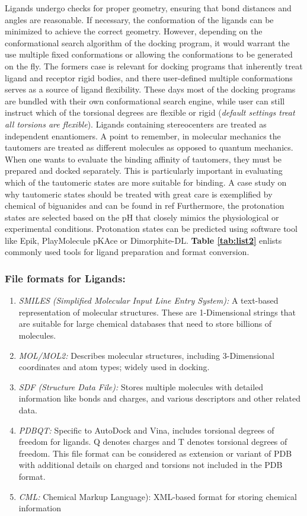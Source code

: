 Ligands undergo checks for proper geometry, ensuring that bond distances and angles are reasonable. If necessary, the conformation of the ligands can be minimized to achieve the correct geometry. However, depending on the conformational search algorithm of the docking program, it would warrant the use multiple fixed conformations or allowing the conformations to be generated on the fly. The formers case is relevant for docking programs that inherently treat ligand and receptor rigid bodies, and there user-defined multiple conformations serves as a source of ligand flexibility. These days most of the docking programs are bundled with their own conformational search engine, while user can still instruct which of the torsional degrees are flexible or rigid (\textit{default settings treat all torsions are flexible}).
Ligands containing stereocenters are treated as independent enantiomers. A point to remember, in molecular mechanics the tautomers are treated as different molecules as opposed to quantum mechanics. When one wants to evaluate the binding affinity of tautomers, they must be prepared and docked separately. This is particularly important in evaluating which of the tautomeric states are more suitable for binding. A case study on why tautomeric states should be treated with great care is exemplified by chemical of biguanides and can be found in ref\cite{bib42} Furthermore, the protonation states are selected based on the pH that closely mimics the physiological or experimental conditions. Protonation states can be predicted using software tool like Epik\cite{bib45, bib46}, PlayMolecule pKAce\cite{bib43} or Dimorphite-DL\cite{bib44}. \textbf{Table \ref{tab:list2}} enlists commonly used tools for ligand preparation and format conversion. 

\subsubsection*{File formats for Ligands:}
\begin{enumerate}
        \item \textit{SMILES (Simplified Molecular Input Line Entry System):} A text-based representation of molecular structures. These are 1-Dimensional strings that are suitable for large chemical databases that need to store billions of molecules. 
	   \item \textit{MOL/MOL2:} Describes molecular structures, including 3-Dimensional coordinates and atom types; widely used in docking.
	   \item \textit{SDF (Structure Data File):} Stores multiple molecules with detailed information like bonds and charges, and various descriptors and other related data. 
	   \item \textit{PDBQT:} Specific to AutoDock and Vina, includes torsional degrees of freedom for ligands. Q denotes charges and T denotes torsional degrees of freedom. This file format can be considered as extension or variant of PDB with additional details on charged and torsions not included in the PDB format. 
	   \item \textit{CML:} Chemical Markup Language): XML-based format for storing chemical information
\end{enumerate}


